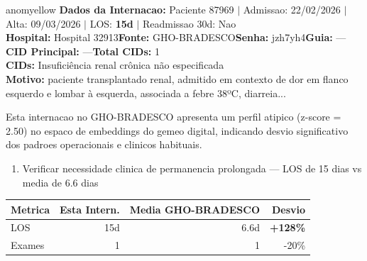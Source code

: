 \documentclass[a4paper,10pt]{article}
\begin{document}
\begin{anomalycard}[Internacao 118455 | GHO-BRADESCO | MODERADO (z=2.50)]{anomyellow}
\textbf{Dados da Internacao:} Paciente 87969 $\mid$ Admissao: 22/02/2026 $\mid$ Alta: 09/03/2026 $\mid$ LOS: \textbf{15d} $\mid$ Readmissao 30d: Nao\\
\textbf{Hospital:} Hospital 32913\quad\textbf{Fonte:} GHO-BRADESCO\quad\textbf{Senha:} jzh7yh4\quad\textbf{Guia:} ---\\
\textbf{CID Principal:} {\small ---}\quad\textbf{Total CIDs:} 1\\

\textbf{CIDs:} {\scriptsize Insuficiência renal crônica não especificada}\\

\textbf{Motivo:} {\scriptsize paciente transplantado renal, admitido em contexto de dor em flanco esquerdo e lombar à esquerda, associada a febre 38ºC, diarreia...}\\

\vspace{2pt}\begin{tcolorbox}[colback=severityred!20,colframe=anomyellow,title={\textbf{Interpretacao de Negocio}},fonttitle=\bfseries\small,left=4pt,right=4pt,top=3pt,bottom=3pt]
{\small Esta internacao no GHO-BRADESCO apresenta um perfil atipico (z-score = 2.50) no espaco de embeddings do gemeo digital, indicando desvio significativo dos padroes operacionais e clinicos habituais.}
\end{tcolorbox}
\begin{tcolorbox}[colback=severityyellow!30,colframe=anomorange,title={\textbf{Recomendacoes Especificas}},fonttitle=\bfseries\small,left=4pt,right=4pt,top=3pt,bottom=3pt]
\begin{enumerate}[nosep,leftmargin=16pt]
\item {\small Verificar necessidade clinica de permanencia prolongada --- LOS de 15 dias vs media de 6.6 dias}
\end{enumerate}
\end{tcolorbox}
\begin{center}\begin{tabular}{l r r r}\toprule\textbf{Metrica} & \textbf{Esta Intern.} & \textbf{Media GHO-BRADESCO} & \textbf{Desvio} \\\midrule
LOS & 15d & 6.6d & \textcolor{anomred}{\textbf{+128\%}} \\
Exames & 1 & 1 & -20\% \\
\bottomrule\end{tabular}\end{center}


\end{anomalycard}
\end{document}
